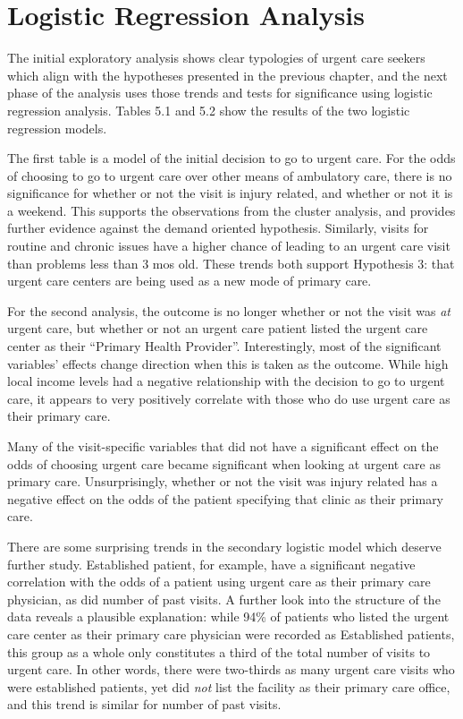 \documentclass[12pt,twoside]{reedthesis}
\begin{document}
  \section*{Logistic Regression
  Analysis}\label{logistic-regression-analysis}
  
  The initial exploratory analysis shows clear typologies of urgent care
  seekers which align with the hypotheses presented in the previous
  chapter, and the next phase of the analysis uses those trends and tests
  for significance using logistic regression analysis. Tables 5.1 and 5.2
  show the results of the two logistic regression models.
  
  The first table is a model of the initial decision to go to urgent care.
  For the odds of choosing to go to urgent care over other means of
  ambulatory care, there is no significance for whether or not the visit
  is injury related, and whether or not it is a weekend. This supports the
  observations from the cluster analysis, and provides further evidence
  against the demand oriented hypothesis. Similarly, visits for routine
  and chronic issues have a higher chance of leading to an urgent care
  visit than problems less than 3 mos old. These trends both support
  Hypothesis 3: that urgent care centers are being used as a new mode of
  primary care.
  
  For the second analysis, the outcome is no longer whether or not the
  visit was \emph{at} urgent care, but whether or not an urgent care
  patient listed the urgent care center as their ``Primary Health
  Provider''. Interestingly, most of the significant variables' effects
  change direction when this is taken as the outcome. While high local
  income levels had a negative relationship with the decision to go to
  urgent care, it appears to very positively correlate with those who do
  use urgent care as their primary care.
  
  Many of the visit-specific variables that did not have a significant
  effect on the odds of choosing urgent care became significant when
  looking at urgent care as primary care. Unsurprisingly, whether or not
  the visit was injury related has a negative effect on the odds of the
  patient specifying that clinic as their primary care.
  
  There are some surprising trends in the secondary logistic model which
  deserve further study. Established patient, for example, have a
  significant negative correlation with the odds of a patient using urgent
  care as their primary care physician, as did number of past visits. A
  further look into the structure of the data reveals a plausible
  explanation: while 94\% of patients who listed the urgent care center as
  their primary care physician were recorded as Established patients, this
  group as a whole only constitutes a third of the total number of visits
  to urgent care. In other words, there were two-thirds as many urgent
  care visits who were established patients, yet did \emph{not} list the
  facility as their primary care office, and this trend is similar for
  number of past visits.
  
\end{document}
